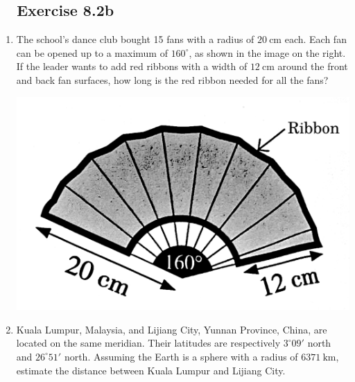 \documentclass{report}
\newcommand{\exercise}[1]{%
    \subsection*{\faPencil\ \ Exercise #1\hspace{0.5em}\xrfill[0.175\baselineskip]{1pt}}
}
\begin{document}
\newpage

\exercise{8.2b}

\begin{enumerate}
    \item \begin{multicols}{2}
        The school's dance club bought 15 fans with a radius of $20 \mathrm{~cm}$ each. Each fan can be opened up to a maximum of $160^{\circ}$, as shown in the image on the right. If the leader wants to add red ribbons with a width of $12 \mathrm{~cm}$ around the front and back fan surfaces, how long is the red ribbon needed for all the fans?

        \begin{center}
            \includegraphics[scale=0.14]{assets/8-27.png}
        \end{center}
    \end{multicols}

    \item \begin{multicols}{2}
        Kuala Lumpur, Malaysia, and Lijiang City, Yunnan Province, China, are located on the same meridian. Their latitudes are respectively $3^\circ 09'$ north and $26^\circ 51'$ north. Assuming the Earth is a sphere with a radius of $6371 \mathrm{~km}$, estimate the distance between Kuala Lumpur and Lijiang City.


\end{multicols}
\end{enumerate}
\end{document}
